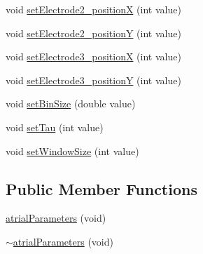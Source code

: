 \begin{DoxyCompactItemize}
\item 
void \hyperlink{classatrial_parameters_ad2ecccd64402e3f9f9f197d969ff58e9}{set\+Electrode2\+\_\+position\+X} (int value)
\item 
void \hyperlink{classatrial_parameters_a66798a95755bbe346a9246ddb7e1d02b}{set\+Electrode2\+\_\+position\+Y} (int value)
\item 
void \hyperlink{classatrial_parameters_a2336c830af73068117a93804c5c694e4}{set\+Electrode3\+\_\+position\+X} (int value)
\item 
void \hyperlink{classatrial_parameters_a04207d9997beba0537867757d6423e85}{set\+Electrode3\+\_\+position\+Y} (int value)
\item 
void \hyperlink{classatrial_parameters_a6c9455e7633f4d4c52e0533057de0690}{set\+Bin\+Size} (double value)
\item 
void \hyperlink{classatrial_parameters_a450421c3abc5eecff0bca9f73a7a72d8}{set\+Tau} (int value)
\item 
void \hyperlink{classatrial_parameters_a70d48a5b6678542337abedc02954c29d}{set\+Window\+Size} (int value)
\end{DoxyCompactItemize}
\subsection*{Public Member Functions}
\begin{DoxyCompactItemize}
\item 
\hyperlink{classatrial_parameters_ab1f58bc297661ea9d029ea59c4d7b59f}{atrial\+Parameters} (void)
\item 
\hyperlink{classatrial_parameters_aa930d083682b226f2341beb27a593a4a}{$\sim$atrial\+Parameters} (void)
\end{DoxyCompactItemize}
